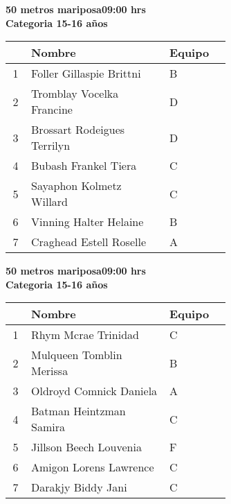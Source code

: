 \begin{minipage}{0.95\linewidth}\vspace{0.5cm} 
\begin{flushleft}
\textbf{
\hspace{-0.15cm}50 metros mariposa\hspace{1.5cm}09:00 hrs \\Categoria 15-16 años}\vspace{-0.2cm} 
\end{flushleft}
\begin{tabular}{cp{0.63\linewidth}l}
\hline
& \textbf{Nombre} & \textbf{Equipo} \\ \hline
1 & Foller Gillaspie Brittni & B \\ 
2 & Tromblay Vocelka Francine & D \\ 
3 & Brossart Rodeigues Terrilyn & D \\ 
4 & Bubash Frankel Tiera & C \\ 
5 & Sayaphon Kolmetz Willard & C \\ 
6 & Vinning Halter Helaine & B \\ 
7 & Craghead Estell Roselle & A \\ 
\end{tabular}
\end{minipage}
\begin{minipage}{0.95\linewidth}\vspace{0.5cm} 
\begin{flushleft}
\textbf{
\hspace{-0.15cm}50 metros mariposa\hspace{1.5cm}09:00 hrs \\Categoria 15-16 años}\vspace{-0.2cm} 
\end{flushleft}
\begin{tabular}{cp{0.63\linewidth}l}
\hline
& \textbf{Nombre} & \textbf{Equipo} \\ \hline
1 & Rhym Mcrae Trinidad & C \\ 
2 & Mulqueen Tomblin Merissa & B \\ 
3 & Oldroyd Comnick Daniela & A \\ 
4 & Batman Heintzman Samira & C \\ 
5 & Jillson Beech Louvenia & F \\ 
6 & Amigon Lorens Lawrence & C \\ 
7 & Darakjy Biddy Jani & C \\ 
\end{tabular}
\end{minipage}
